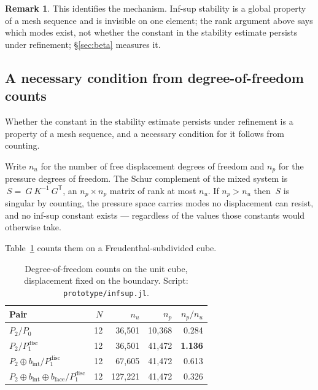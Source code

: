\documentclass[11pt]{article}
\newcommand{\transpose}[1]{#1^{\mathsf{T}}}
\newcommand{\code}[1]{\texttt{#1}}
\theoremstyle{definition}
\newtheorem{remark}{Remark}
\theoremstyle{plain}
\begin{document}
\begin{remark}
This identifies the mechanism. Inf-sup stability is a
global property of a mesh sequence and is invisible on one element; the rank
argument above says which modes exist, not whether the constant in the stability
estimate persists under refinement; \S\ref{sec:beta} measures it.
\end{remark}

\subsection{A necessary condition from degree-of-freedom counts}
\label{sec:infsup}

Whether the constant in the stability estimate persists under refinement is a
property of a mesh sequence, and a necessary condition for it follows from
counting.

Write $n_u$ for the number of free displacement degrees of freedom and $n_p$
for the pressure degrees of freedom. The Schur complement of the mixed system
is $~S = ~G ~K^{-1} \transpose{~G}$, an $n_p \times n_p$ matrix of rank at most
$n_u$. If $n_p > n_u$ then $~S$ is singular by counting, the pressure
space carries modes no displacement can resist, and no inf-sup constant exists
--- regardless of the values those constants would otherwise take.

Table~\ref{tab:dofcount} counts them on a Freudenthal-subdivided cube.

\begin{table}[h]
\centering
\begin{tabular}{@{}lrrrr@{}}
\toprule
Pair & $N$ & $n_u$ & $n_p$ & $n_p/n_u$ \\
\midrule
$P_2/P_0$                              & 12 & 36{,}501 & 10{,}368 & 0.284 \\
$P_2/P_1^{\mathrm{disc}}$              & 12 & 36{,}501 & 41{,}472 & \textbf{1.136} \\
$P_2 \oplus b_{\mathrm{int}} / P_1^{\mathrm{disc}}$ & 12 & 67{,}605 & 41{,}472 & 0.613 \\
$P_2 \oplus b_{\mathrm{int}} \oplus b_{\mathrm{face}} / P_1^{\mathrm{disc}}$
                                       & 12 & 127{,}221 & 41{,}472 & 0.326 \\
\bottomrule
\end{tabular}
\caption{Degree-of-freedom counts on the unit cube, displacement fixed on the
boundary. Script: \code{prototype/infsup.jl}.}
\label{tab:dofcount}
\end{table}
\end{document}
